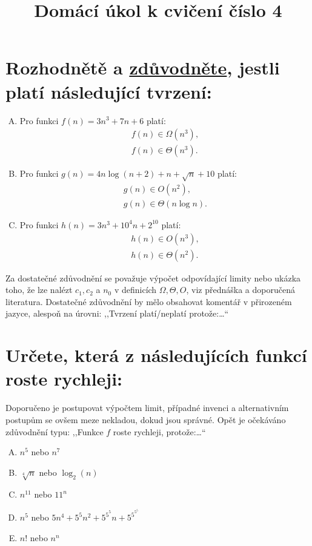 \documentclass[12pt,oneside]{article}
\title{Domácí úkol k cvičení číslo 4}
\author{}
\begin{document}
	\maketitle
	\section{Rozhodnětě a \underline{zdůvodněte}, jestli platí následující tvrzení:}
	\begin{enumerate}[A)]
		\item Pro funkci $f(n) = 3n^3 + 7n + 6$ platí:
		\begin{align}
			f(n) \in \Omega(n^3), \\
			f(n) \in \Theta(n^3).
		\end{align}
		\item Pro funkci $g(n) = 4n\log(n+2) + n + \sqrt{n}+ 10$ platí:
		\begin{align}
			g(n) \in O(n^2), \\
			g(n) \in \Theta(n\log n).
		\end{align}
		\item Pro funkci $h(n) = 3n^3 + 10^4n + 2^{10} $ platí:
		\begin{align}
			h(n) \in O(n^3) ,\\
			h(n) \in \Theta(n^2).
		\end{align}
	\end{enumerate}
	Za dostatečné zdůvodnění se považuje výpočet odpovídající limity nebo ukázka toho, že lze nalézt $c_1, c_2$ a $n_0$ v definicích $\Omega, \Theta, O$, viz přednáška a doporučená literatura.
	Dostatečné zdůvodnění by mělo obsahovat komentář v přirozeném jazyce, alespoň na úrovni: ,,Tvrzení platí/neplatí protože:\dots``
	
	\section{Určete, která z následujících funkcí roste rychleji:}
	Doporučeno je postupovat výpočtem limit, případné invenci a alternativním postupům se ovšem meze nekladou, dokud jsou správné.
	Opět je očekáváno zdůvodnění typu: ,,Funkce $f$ roste rychleji, protože:\dots``
	\begin{enumerate}[A)]
		\item $n^5$ nebo $n^7$
		\item $\sqrt[4]{n}$ nebo $\log_2(n)$
		\item $n^{11}$ nebo $11^n$
		\item $n^5$ nebo $5n^4 + 5^5n^2 + 5^{5^5}n + 5^{5^{5^5}}$
		\item $n!$ nebo $n^n$
	\end{enumerate}
	
\end{document}
